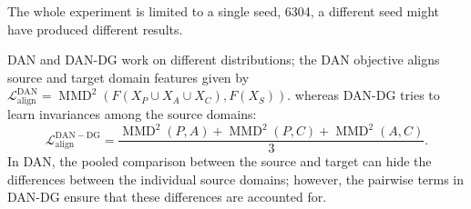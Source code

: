The whole experiment is limited to a single seed, 6304, a different seed might have produced different results.

DAN and DAN-DG work on different distributions; the DAN objective aligns source and target domain features given by  \(\mathcal L_{\mathrm{align}}^{\mathrm{DAN}} = \operatorname{MMD}^2 \left( F(X_P\cup X_A\cup X_C), F(X_S) \right).\) whereas DAN-DG tries to learn invariances among the source domains:
\[ \mathcal L_{\mathrm{align}}^{\mathrm{DAN-DG}} = \frac{ \operatorname{MMD}^2(P,A) + \operatorname{MMD}^2(P,C) + \operatorname{MMD}^2(A,C) }{3}. \]
In DAN, the pooled comparison between the source and target can hide the differences between the individual source domains; however, the pairwise terms in DAN-DG ensure that these differences are accounted for.

